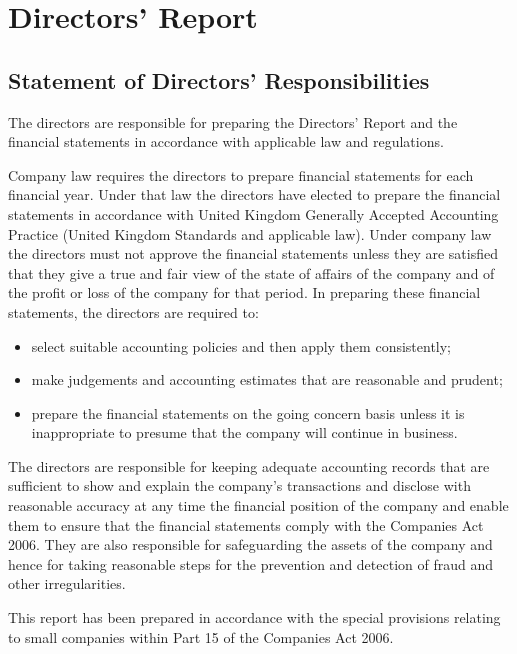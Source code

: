 \section{Directors' Report}

\subsection{Statement of Directors' Responsibilities}
The directors are responsible for preparing the Directors' Report and the financial statements in accordance with applicable law and regulations.

Company law requires the directors to prepare financial statements for each financial year. Under that law the directors have elected to prepare the financial statements in accordance with United Kingdom Generally Accepted Accounting Practice (United Kingdom Standards and applicable law). Under company law the directors must not approve the financial statements unless they are satisfied that they give a true and fair view of the state of affairs of the company and of the profit or loss of the company for that period. In preparing these financial statements, the directors are required to:

\begin{itemize}
    \item select suitable accounting policies and then apply them consistently;
    \item make judgements and accounting estimates that are reasonable and prudent;
    \item prepare the financial statements on the going concern basis unless it is inappropriate to presume that the company will continue in business.
\end{itemize}

The directors are responsible for keeping adequate accounting records that are sufficient to show and explain the company's transactions and disclose with reasonable accuracy at any time the financial position of the company and enable them to ensure that the financial statements comply with the Companies Act 2006. They are also responsible for safeguarding the assets of the company and hence for taking reasonable steps for the prevention and detection of fraud and other irregularities.

This report has been prepared in accordance with the special provisions relating to small companies within Part 15 of the Companies Act 2006.
\pagebreak
